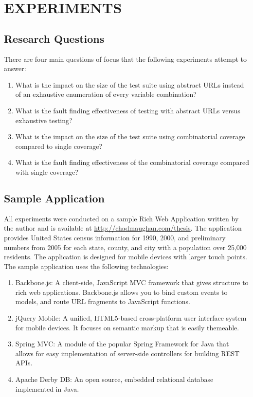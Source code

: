 \chapter{\uppercase{EXPERIMENTS}}

\section{Research Questions}
There are four main questions of focus that the following experiments attempt to answer:
\begin{enumerate}
	\item What is the impact on the size of the test suite using abstract URLs instead of an exhaustive enumeration of every variable combination?
	\item What is the fault finding effectiveness of testing with abstract URLs versus exhaustive testing?
	\item What is the impact on the size of the test suite using combinatorial coverage compared to single coverage?
	\item What is the fault finding effectiveness of the combinatorial coverage compared with single coverage?
\end{enumerate}

\section{Sample Application}
All experiments were conducted on a sample Rich Web Application written by the author and is available at \url{http://chadmaughan.com/thesis}.  The application provides United States census information for 1990, 2000, and preliminary numbers from 2005 for each state, county, and city with a population over 25,000 residents.  The application is designed for mobile devices with larger touch points.  The sample application uses the following technologies:

\begin{enumerate}
\item Backbone.js: A client-side, JavaScript MVC framework that gives structure to rich web applications.  Backbone.js allows you to bind custom events to models, and route URL fragments to JavaScript functions.
\item jQuery Mobile: A unified, HTML5-based cross-platform user interface system for mobile devices.  It focuses on semantic markup that is easily themeable.
\item Spring MVC: A module of the popular Spring Framework for Java that allows for easy implementation of server-side controllers for building REST APIs.
\item Apache Derby DB: An open source, embedded relational database implemented in Java.
\end{enumerate}

